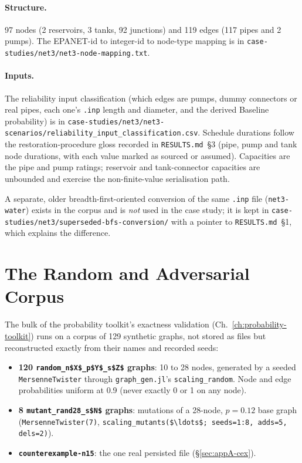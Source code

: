 \documentclass[12pt]{report}
\providecommand{\filepath}[1]{\nolinkurl{#1}}
\begin{document}
\paragraph{Structure.} 97 nodes (2 reservoirs, 3 tanks, 92 junctions) and 119 edges (117
pipes and 2 pumps). The EPANET-id to integer-id to node-type mapping is in
\filepath{case-studies/net3/net3-node-mapping.txt}.

\paragraph{Inputs.} The reliability input classification (which edges are pumps, dummy
connectors or real pipes, each one's \filepath{.inp} length and diameter, and the derived
Baseline probability) is in
\filepath{case-studies/net3/net3-scenarios/reliability\_input\_classification.csv}. Schedule
durations follow the restoration-procedure gloss recorded in \filepath{RESULTS.md}~\S3
(pipe, pump and tank node durations, with each value marked as sourced or assumed).
Capacities are the pipe and pump ratings; reservoir and tank-connector capacities are
unbounded and exercise the non-finite-value serialisation path.

A separate, older breadth-first-oriented conversion of the same \filepath{.inp} file
(\texttt{net3-water}) exists in the corpus and is \emph{not} used in the case study; it is
kept in \filepath{case-studies/net3/superseded-bfs-conversion/} with a pointer to
\filepath{RESULTS.md}~\S1, which explains the difference.

\section{The Random and Adversarial Corpus}
\label{sec:appA-corpus}

The bulk of the probability toolkit's exactness validation
(Ch.~\ref{ch:probability-toolkit}) runs on a corpus of 129 synthetic graphs, not stored as
files but reconstructed exactly from their names and recorded seeds:

\begin{itemize}[nosep]
  \item \textbf{120 \filepath{random_n$X$_p$Y$_s$Z$} graphs}: 10 to 28 nodes, generated
        by a seeded \texttt{MersenneTwister} through \filepath{graph_gen.jl}'s
        \filepath{scaling_random}. Node and edge probabilities uniform at 0.9 (never
        exactly 0 or 1 on any node).
  \item \textbf{8 \filepath{mutant_rand28_s$N$} graphs}: mutations of a 28-node,
        $p = 0.12$ base graph (\texttt{MersenneTwister(7)},
        \filepath{scaling_mutants($\ldots$; seeds=1:8, adds=5, dels=2)}).
  \item \textbf{\texttt{counterexample-n15}}: the one real persisted file
        (\S\ref{sec:appA-cex}).
\end{itemize}
\end{document}
